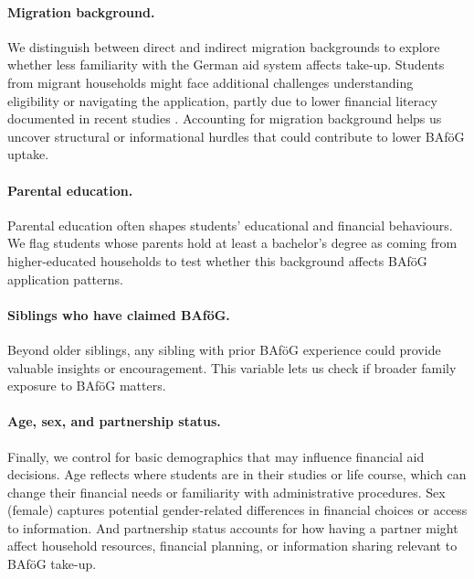 \paragraph{Migration background.}  
We distinguish between direct and indirect migration backgrounds to explore whether less familiarity with the German aid system affects take-up.  
Students from migrant households might face additional challenges understanding eligibility or navigating the application, partly due to lower financial literacy documented in recent studies \citep{Tsegay_2024}.  
Accounting for migration background helps us uncover structural or informational hurdles that could contribute to lower BAföG uptake.

\paragraph{Parental education.}  
Parental education often shapes students’ educational and financial behaviours.  
We flag students whose parents hold at least a bachelor’s degree as coming from higher-educated households to test whether this background affects BAföG application patterns.

\paragraph{Siblings who have claimed BAföG.}  
Beyond older siblings, any sibling with prior BAföG experience could provide valuable insights or encouragement.  
This variable lets us check if broader family exposure to BAföG matters.

\paragraph{Age, sex, and partnership status.}  
Finally, we control for basic demographics that may influence financial aid decisions.  
Age reflects where students are in their studies or life course, which can change their financial needs or familiarity with administrative procedures.  
Sex (female) captures potential gender-related differences in financial choices or access to information.  
And partnership status accounts for how having a partner might affect household resources, financial planning, or information sharing relevant to BAföG take-up.




